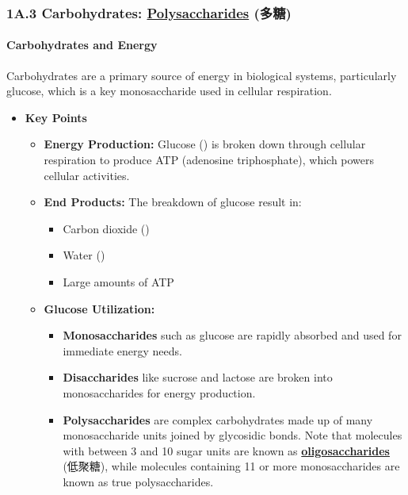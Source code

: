 
\subsubsection{1A.3 Carbohydrates: \underline{Polysaccharides} (多糖)}
\paragraph{Carbohydrates and Energy}
Carbohydrates are a primary source of energy in biological systems, particularly glucose, which is a key monosaccharide used in
cellular respiration.
\begin{itemize}
    \item \textbf{Key Points}
    \begin{itemize}
        \item \textbf{Energy Production:} Glucose () is broken down through cellular respiration to produce ATP
        (adenosine triphosphate), which powers cellular activities.
        \item \textbf{End Products:} The breakdown of glucose result in:
        \begin{itemize}
            \item Carbon dioxide ()
            \item Water ()
            \item Large amounts of ATP
        \end{itemize}
        \item \textbf{Glucose Utilization:}
        \begin{itemize}
            \item \textbf{Monosaccharides} such as glucose are rapidly absorbed and used for immediate energy needs.
            \item \textbf{Disaccharides} like sucrose and lactose are broken into monosaccharides for energy production.
            \item \textbf{Polysaccharides} are complex carbohydrates made up of many monosaccharide units joined by glycosidic
            bonds. Note that molecules with between 3 and 10 sugar units are known as \underline{\textbf{oligosaccharides}}
            (低聚糖), while molecules containing 11 or more monosaccharides are known as true polysaccharides.
            \begin{figure}[H]

\end{figure}
\end{itemize}
\end{itemize}
\end{itemize}
